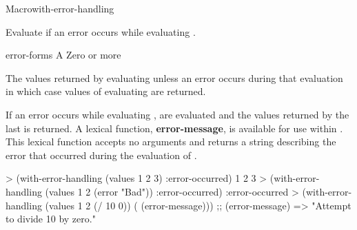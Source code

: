 \documentclass[10pt,twoside,english,pdftex]{article}
\begin{document}
\begin{functiondoc}{Macro}{with-error-handling}{ 
    \superstar{} \returns{} \superstar} 
%
%
%  
\fnsyntax

\fnpurpose Evaluate  if an error occurs while evaluating
. 

\fnpackage {}

\fnmodule {}

\fnargs
\begin{args}{error-forms}
\arg[form] A 
 Zero or more 
\end{args}

\fnreturns The values returned by evaluating  unless an
error occurs during that evaluation in which case values of evaluating 
 are returned.

\fndescription If an error occurs while evaluating ,
 are evaluated and the values returned by the last
 is returned.  A lexical function, \textbf{error-message},
is available for use within .  This lexical function accepts
no arguments and returns a string describing the error that occurred during
the evaluation of .

%
\fnexamples
\begin{example}
> (with-error-handling (values 1 2 3) :error-occurred)
1
2
3
> (with-error-handling (values 1 2 (error "Bad")) :error-occurred)
:error-occurred
> (with-error-handling (values 1 2 (/ 10 0)) ( (error-message)))
;;  (error-message) => "Attempt to divide 10 by zero."
\end{example}

\end{functiondoc}

\end{document}
